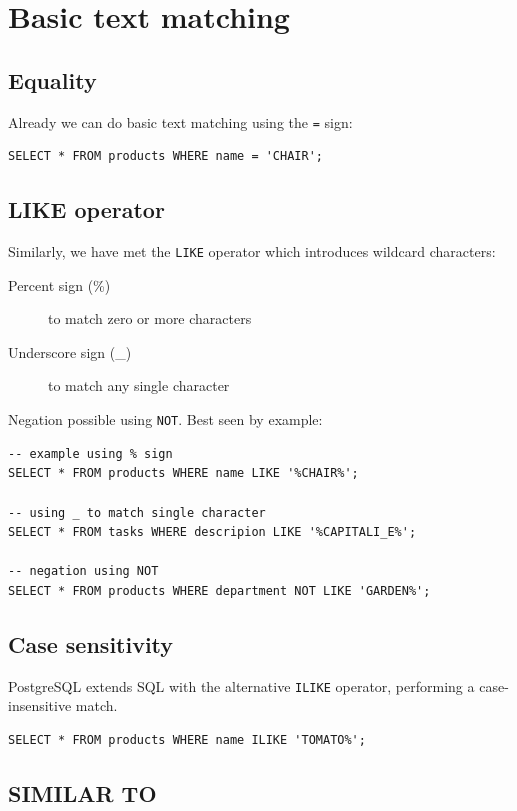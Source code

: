 \documentclass{pgnotes}
\begin{document}
\section{Basic text matching}

\subsection{Equality}

Already we can do basic text matching using the \texttt{=} sign:
\begin{verbatim}
SELECT * FROM products WHERE name = 'CHAIR';
\end{verbatim}

\subsection{LIKE operator}

Similarly, we have met the \texttt{LIKE} operator which introduces wildcard characters:
\begin{description}
\item[Percent sign (\%)] to match zero or more characters
\item[Underscore sign (\_)] to match any single character
\end{description}
Negation possible using \texttt{NOT}. 
Best seen by example:

\begin{verbatim}
-- example using % sign
SELECT * FROM products WHERE name LIKE '%CHAIR%';

-- using _ to match single character
SELECT * FROM tasks WHERE descripion LIKE '%CAPITALI_E%';

-- negation using NOT
SELECT * FROM products WHERE department NOT LIKE 'GARDEN%';
\end{verbatim}

\subsection{Case sensitivity}

PostgreSQL extends SQL with the alternative \texttt{ILIKE} operator, performing a case-insensitive match.

\begin{verbatim}
SELECT * FROM products WHERE name ILIKE 'TOMATO%';
\end{verbatim}

\subsection{SIMILAR TO}
\end{document}
